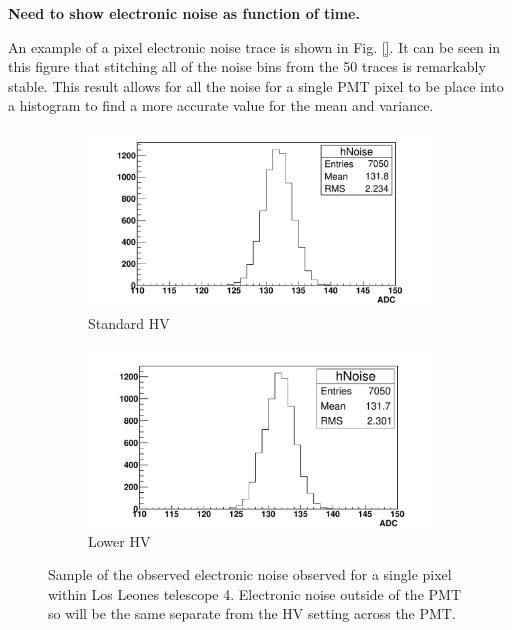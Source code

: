 \textbf{Need to show electronic noise as function of time.}

An example of a pixel electronic noise trace is shown in Fig. \ref{}. It can be seen in this figure that stitching all of the noise bins from the 50 traces is remarkably stable. This result allows for all the noise for a single PMT pixel to be place into a histogram to find a more accurate value for the mean and variance.

\begin{figure} %
\centering
\begin{subfigure}[b]{0.95\textwidth}
\includegraphics[width=\textwidth]{chapters/graphs/GainVarsMeas/LL_m04_2016-06-11/example_NoiseHist1.pdf}
\caption{Standard HV}
\end{subfigure}
\vspace{3mm}
\begin{subfigure}[b]{0.95\textwidth}
\includegraphics[width=\textwidth]{chapters/graphs/GainVarsMeas/LL_m04_2016-06-11/example_NoiseHist2.pdf}
\caption{Lower HV}
\end{subfigure}
\caption{Sample of the observed electronic noise observed for a single pixel within Los Leones telescope 4. Electronic noise outside of the PMT so will be the same separate from the HV setting across the PMT.}
\end{figure}

